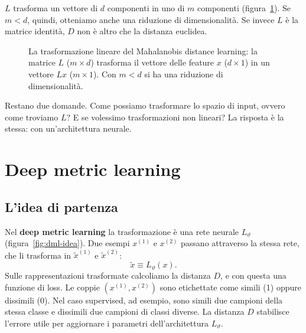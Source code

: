 $L$ trasforma un vettore di $d$ componenti in uno di $m$ componenti (figura~\ref{fig:mahalanobis}). Se $m < d$, quindi, otteniamo anche una riduzione di dimensionalità. Se invece $L$ è la matrice identità, $D$ non è altro che la distanza euclidea.

\begin{figure}[htbp]
\centering
{}
\caption{La trasformazione lineare del Mahalanobis distance learning: la matrice $L$ ($m \times d$) trasforma il vettore delle feature $x$ ($d \times 1$) in un vettore $Lx$ ($m \times 1$). Con $m < d$ si ha una riduzione di dimensionalità.}
\label{fig:mahalanobis}
\end{figure}

Restano due domande. Come possiamo trasformare lo spazio di input, ovvero come troviamo $L$? E se volessimo trasformazioni non lineari? La risposta è la stessa: con un'architettura neurale.

\section{Deep metric learning}
\subsection{L'idea di partenza}
Nel \textbf{deep metric learning} la trasformazione è una rete neurale $L_\vartheta$ (figura~\ref{fig:dml-idea}). Due esempi $x^{(1)}$ e $x^{(2)}$ passano attraverso la stessa rete, che li trasforma in $\tilde{x}^{(1)}$ e $\tilde{x}^{(2)}$:
\[
\tilde{x} \equiv L_\vartheta(x).
\]
Sulle rappresentazioni trasformate calcoliamo la distanza $D$, e con questa una funzione di loss. Le coppie $(x^{(1)}, x^{(2)})$ sono etichettate come simili (1) oppure dissimili (0). Nel caso supervised, ad esempio, sono simili due campioni della stessa classe e dissimili due campioni di classi diverse. La distanza $D$ stabilisce l'errore utile per aggiornare i parametri dell'architettura $L_\vartheta$.

